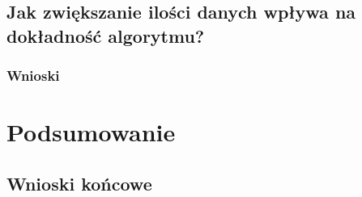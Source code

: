\documentclass[12pt, a4paper]{article}
\begin{document}
\subsection{Jak zwiększanie ilości danych wpływa na dokładność algorytmu?}

\subsubsection{Wnioski}

\section{Podsumowanie}

\subsection{Wnioski końcowe}

\nocite{*}


\end{document}
